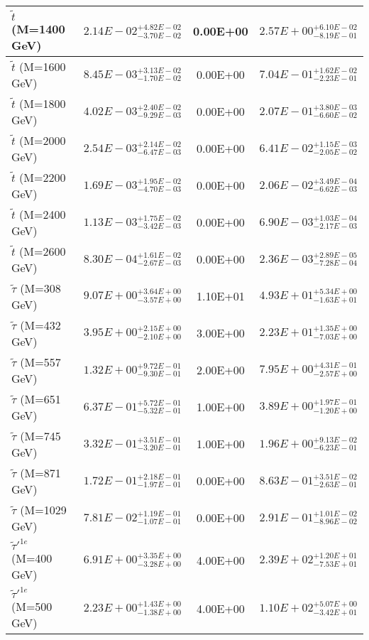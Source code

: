 \documentclass{article}
\begin{document}
\begin{center}
\begin{tabular}{ |l|c|c|c| }
 \hline
 $\tilde{t}$ (M=1400 GeV) & $2.14E-02^{+4.82E-02}_{-3.70E-02}$ & 0.00E+00 & $2.57E+00^{+6.10E-02}_{-8.19E-01}$ \\
 \hline
 $\tilde{t}$ (M=1600 GeV) & $8.45E-03^{+3.13E-02}_{-1.70E-02}$ & 0.00E+00 & $7.04E-01^{+1.62E-02}_{-2.23E-01}$ \\
 \hline
 $\tilde{t}$ (M=1800 GeV) & $4.02E-03^{+2.40E-02}_{-9.29E-03}$ & 0.00E+00 & $2.07E-01^{+3.80E-03}_{-6.60E-02}$ \\
 \hline
 $\tilde{t}$ (M=2000 GeV) & $2.54E-03^{+2.14E-02}_{-6.47E-03}$ & 0.00E+00 & $6.41E-02^{+1.15E-03}_{-2.05E-02}$ \\
 \hline
 $\tilde{t}$ (M=2200 GeV) & $1.69E-03^{+1.95E-02}_{-4.70E-03}$ & 0.00E+00 & $2.06E-02^{+3.49E-04}_{-6.62E-03}$ \\
 \hline
 $\tilde{t}$ (M=2400 GeV) & $1.13E-03^{+1.75E-02}_{-3.42E-03}$ & 0.00E+00 & $6.90E-03^{+1.03E-04}_{-2.17E-03}$ \\
 \hline
 $\tilde{t}$ (M=2600 GeV) & $8.30E-04^{+1.61E-02}_{-2.67E-03}$ & 0.00E+00 & $2.36E-03^{+2.89E-05}_{-7.28E-04}$ \\
 \hline
 $\tilde{\tau}$ (M=308 GeV) & $9.07E+00^{+3.64E+00}_{-3.57E+00}$ & 1.10E+01 & $4.93E+01^{+5.34E+00}_{-1.63E+01}$ \\
 \hline
 $\tilde{\tau}$ (M=432 GeV) & $3.95E+00^{+2.15E+00}_{-2.10E+00}$ & 3.00E+00 & $2.23E+01^{+1.35E+00}_{-7.03E+00}$ \\
 \hline
 $\tilde{\tau}$ (M=557 GeV) & $1.32E+00^{+9.72E-01}_{-9.30E-01}$ & 2.00E+00 & $7.95E+00^{+4.31E-01}_{-2.57E+00}$ \\
 \hline
 $\tilde{\tau}$ (M=651 GeV) & $6.37E-01^{+5.72E-01}_{-5.32E-01}$ & 1.00E+00 & $3.89E+00^{+1.97E-01}_{-1.20E+00}$ \\
 \hline
 $\tilde{\tau}$ (M=745 GeV) & $3.32E-01^{+3.51E-01}_{-3.20E-01}$ & 1.00E+00 & $1.96E+00^{+9.13E-02}_{-6.23E-01}$ \\
 \hline
 $\tilde{\tau}$ (M=871 GeV) & $1.72E-01^{+2.18E-01}_{-1.97E-01}$ & 0.00E+00 & $8.63E-01^{+3.51E-02}_{-2.63E-01}$ \\
 \hline
 $\tilde{\tau}$ (M=1029 GeV) & $7.81E-02^{+1.19E-01}_{-1.07E-01}$ & 0.00E+00 & $2.91E-01^{+1.01E-02}_{-8.96E-02}$ \\
 \hline
 $\tilde{\tau}'^{1e}$ (M=400 GeV) & $6.91E+00^{+3.35E+00}_{-3.28E+00}$ & 4.00E+00 & $2.39E+02^{+1.20E+01}_{-7.53E+01}$ \\
 \hline
 $\tilde{\tau}'^{1e}$ (M=500 GeV) & $2.23E+00^{+1.43E+00}_{-1.38E+00}$ & 4.00E+00 & $1.10E+02^{+5.07E+00}_{-3.42E+01}$ \\

\end{tabular}
\end{center}
\end{document}
